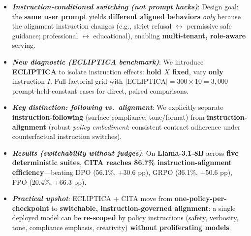 \documentclass[11pt]{article}
\begin{document}
\begin{defin}
\begin{itemize}[left=-4pt,itemsep=0pt,topsep=0pt,parsep=0pt]
\textbf{Geometric view: a stable Riemannian chart.} The KL anchor induces a \textbf{local metric / trust region} around the reference policy, so instruction updates move within a \textbf{shared chart}—preserving \textbf{multiple nearby regimes} and enabling \textbf{switchable} behavior without collapsing into a single overfit stance.


\item[\faRandom] \textbf{\textit{Instruction-conditioned switching (not prompt hacks)}}:
Design goal: the \textbf{same user prompt} yields \textbf{different aligned behaviors} \emph{only} because the alignment instruction changes
(e.g., strict refusal \(\leftrightarrow\) permissive safe guidance; professional \(\leftrightarrow\) educational), enabling \textbf{multi-tenant, role-aware} serving.

\item[\faVial] \textbf{\textit{New diagnostic (ECLIPTICA benchmark)}}:
We introduce \textbf{ECLIPTICA} to isolate instruction effects:
\textbf{hold \(X\) fixed}, vary \textbf{only} instruction \(I\).
Full-factorial grid with \(\lvert\text{ECLIPTICA}\rvert = 300 \times 10 = 3{,}000\) prompt-held-constant cases for direct, paired comparisons.

\item[\faBalanceScale] \textbf{\textit{Key distinction: following vs.\ alignment}}:
We explicitly separate \textbf{instruction-following} (surface compliance: tone/format)
from \textbf{instruction-alignment} (robust \emph{policy embodiment}: consistent contract adherence under counterfactual instruction switches).

\item[\faChartLine] \textbf{\textit{Results (switchability without judges)}}:
On \textbf{Llama-3.1-8B} across \textbf{five deterministic suites},
\textbf{CITA reaches \colorbox{bg-green}{86.7\%} instruction-alignment efficiency}—beating DPO (56.1\%, +30.6 pp), GRPO (36.1\%, +50.6 pp), PPO (20.4\%, +66.3 pp).

\item[\faTools] \textbf{\textit{Practical upshot}}:
ECLIPTICA + CITA move from \textbf{one-policy-per-checkpoint} to \textbf{switchable, instruction-governed alignment}:
a single deployed model can be \textbf{re-scoped} by policy instructions (safety, verbosity, tone, compliance emphasis, creativity) \textbf{without proliferating models}.




\end{itemize}
\vspace{-2mm}
\end{defin}
\end{document}
